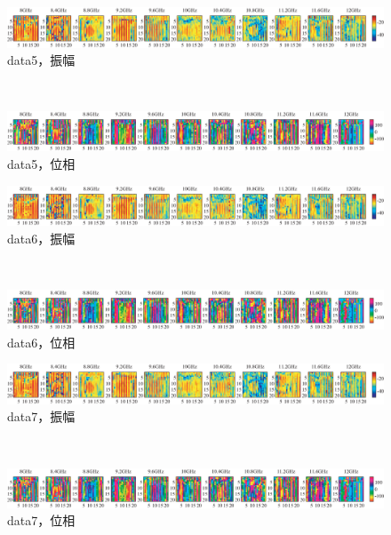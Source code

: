 ﻿\documentclass[12pt,oneside]{jsbook}
\begin{document}
\begin{figure}[bhtp]
 \begin{center}
     \begin{minipage}[c]{\hsize}
\includegraphics[width = \hsize ]{20170205_mine5_a.eps}
\centering\textmd{data5，振幅}
  \end{minipage}
\\
     \begin{minipage}[c]{\hsize}
\includegraphics[width = \hsize ]{20170205_mine5_p.eps}
\centering\textmd{data5，位相}
  \end{minipage}
\end{center}
\end{figure}
\begin{figure}[hbtp]
 \begin{center}
     \begin{minipage}[c]{\hsize}
\includegraphics[width = \hsize ]{20170205_mine6_a.eps}
\centering\textmd{data6，振幅}
  \end{minipage}
\\
     \begin{minipage}[c]{\hsize}
\includegraphics[width = \hsize ]{20170205_mine6_p.eps}
\centering\textmd{data6，位相}
  \end{minipage}
\end{center}
\end{figure}
\begin{figure}[hbtp]
 \begin{center}
     \begin{minipage}[c]{\hsize}
\includegraphics[width = \hsize ]{20170205_mine7_a.eps}
\centering\textmd{data7，振幅}
  \end{minipage}
\\
     \begin{minipage}[c]{\hsize}
\includegraphics[width = \hsize ]{20170205_mine7_p.eps}
\centering\textmd{data7，位相}
  \end{minipage}
\end{center}
\end{figure}
\end{document}
